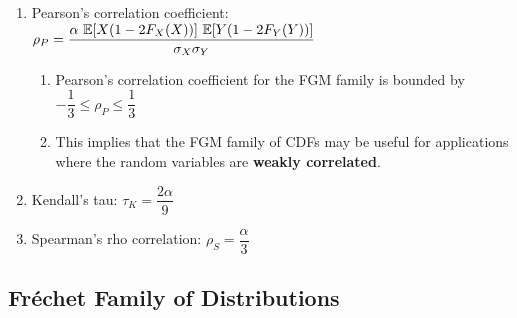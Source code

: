 \begin{enumerate}
    \item Pearson’s correlation coefficient:
    $
        \rho_P = \dfrac{\alpha\ \mbbE[X (1 - 2F_X (X))]\ \mbbE[Y (1 - 2F_Y (Y ))] }{\sigma_X \sigma_Y}
    $
    \hfill \cite{statistics/book/Statistics-for-Data-Scientists/Maurits-Kaptein}
    \begin{enumerate}
        \item Pearson’s correlation coefficient for the FGM family is bounded by $-\dfrac{1}{3} \leq \rho_P \leq \dfrac{1}{3}$
        \hfill \cite{statistics/book/Statistics-for-Data-Scientists/Maurits-Kaptein}

        \item This implies that the FGM family of CDFs may be useful for applications where the random variables are \textbf{weakly correlated}.
        \hfill \cite{statistics/book/Statistics-for-Data-Scientists/Maurits-Kaptein}
    \end{enumerate}

    \item Kendall’s tau: $\tau_K = \dfrac{2\alpha}{9}$
    \hfill \cite{statistics/book/Statistics-for-Data-Scientists/Maurits-Kaptein}

    \item Spearman’s rho correlation: $\rho_S = \dfrac{\alpha}{3}$
    \hfill \cite{statistics/book/Statistics-for-Data-Scientists/Maurits-Kaptein}
\end{enumerate}



\subsection{Fréchet Family of Distributions}

